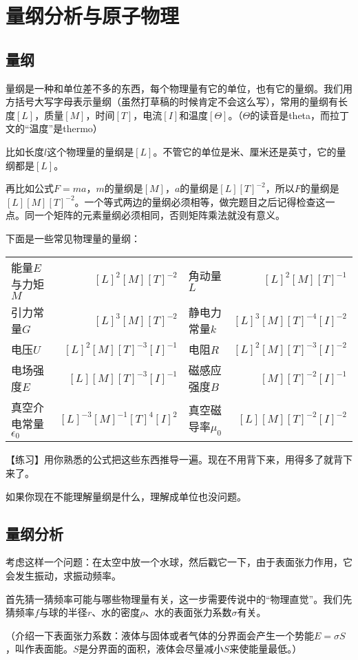 \chapter{量纲分析与原子物理}
\section{量纲}
量纲是一种和单位差不多的东西，每个物理量有它的单位，也有它的量纲。我们用方括号大写字母表示量纲（虽然打草稿的时候肯定不会这么写），常用的量纲有长度$[L]$，质量$[M]$，时间$[T]$，电流$[I]$和温度$[\Theta]$。（$\Theta$的读音是theta，而拉丁文的“温度”是thermo）

比如长度$l$这个物理量的量纲是$[L]$。不管它的单位是米、厘米还是英寸，它的量纲都是$[L]$。

再比如公式$F=m a$，$m$的量纲是$[M]$，$a$的量纲是$[L] [T]^{-2}$，所以$F$的量纲是$[L] [M] [T]^{-2}$。一个等式两边的量纲必须相等，做完题目之后记得检查这一点。同一个矩阵的元素量纲必须相同，否则矩阵乘法就没有意义。

下面是一些常见物理量的量纲：

\begin{tabular}{lrlr}
能量$E$与力矩$M$ & $[L]^2 [M] [T]^{-2}$ & 角动量$L$ & $[L]^2 [M] [T]^{-1}$ \\
引力常量$G$ & $[L]^3 [M] [T]^{-2}$ & 静电力常量$k$ & $[L]^3 [M] [T]^{-4} [I]^{-2}$ \\
电压$U$ & $[L]^2 [M] [T]^{-3} [I]^{-1}$ & 电阻$R$ & $[L]^2 [M] [T]^{-3} [I]^{-2}$ \\
电场强度$E$ & $[L] [M] [T]^{-3} [I]^{-1}$ & 磁感应强度$B$ & $[M] [T]^{-2} [I]^{-1}$ \\
真空介电常量$\epsilon_0$ & $[L]^{-3} [M]^{-1} [T]^4 [I]^2$ & 真空磁导率$\mu_0$ & $[L] [M] [T]^{-2} [I]^{-2}$ \\
\end{tabular}

【练习】用你熟悉的公式把这些东西推导一遍。现在不用背下来，用得多了就背下来了。

如果你现在不能理解量纲是什么，理解成单位也没问题。
\section{量纲分析}
考虑这样一个问题：在太空中放一个水球，然后戳它一下，由于表面张力作用，它会发生振动，求振动频率。

首先猜一猜频率可能与哪些物理量有关，这一步需要传说中的“物理直觉”。我们先猜频率$f$与球的半径$r$、水的密度$\rho$、水的表面张力系数$\sigma$有关。

（介绍一下表面张力系数：液体与固体或者气体的分界面会产生一个势能$E=\sigma S$，叫作表面能。$S$是分界面的面积，液体会尽量减小$S$来使能量最低。）

